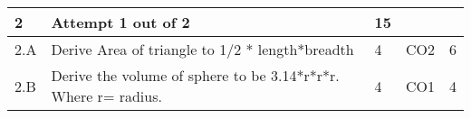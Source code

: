 \documentclass[12pt]{article}
\begin{document}
	
	


	
	
		

	
	
	\begin{longtable}{|L{1cm}|L{8cm}|C{1cm}|C{1cm}|C{1cm}|}\hline
			\bf2 & \bf{Attempt} \bf1 out of \bf2 & \bf15 & & \\ \hline
				2.A &
	Derive Area of triangle to 1/2 * length*breadth \newline
		 &  4 & CO2 & 6\\ \hline
		2.B &
	Derive the volume of sphere to be 3.14*r*r*r. Where r= radius. \newline
		 &  4 & CO1 & 4\\ \hline
		\end{longtable}

	
	


	
	
		
	
\end{document}
